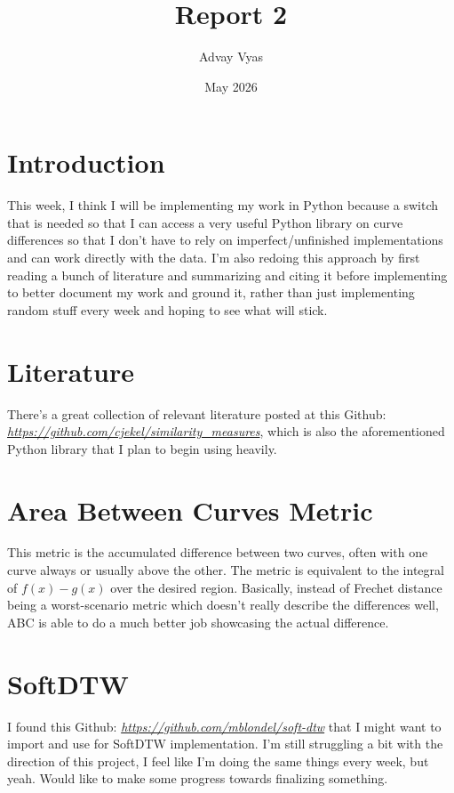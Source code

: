 \documentclass{article}
\title{Report 2}
\author{Advay Vyas}
\date{May 2026}
\begin{document}
\maketitle

\section{Introduction}
This week, I think I will be implementing my work in Python because a switch that is needed so that I can access a very useful Python library on curve differences so that I don't have to rely on imperfect/unfinished implementations and can work directly with the data. I'm also redoing this approach by first reading a bunch of literature and summarizing and citing it before implementing to better document my work and ground it, rather than just implementing random stuff every week and hoping to see what will stick. 

\section{Literature}
There's a great collection of relevant literature posted at this Github: \linebreak\textit{\href{https://github.com/cjekel/similarity_measures}{https://github.com/cjekel/similarity\_measures}}, which is also the aforementioned Python library that I plan to begin using heavily. 

\section{Area Between Curves Metric}
This metric is the accumulated difference between two curves, often with one curve always or usually above the other. The metric is equivalent to the integral of $f(x) - g(x)$ over the desired region. Basically, instead of Frechet distance being a worst-scenario metric which doesn't really describe the differences well, ABC is able to do a much better job showcasing the actual difference. 

\section{SoftDTW}
I found this Github: \textit{\href{https://github.com/mblondel/soft-dtw}{https://github.com/mblondel/soft-dtw}} that I might want to import and use for SoftDTW implementation. I'm still struggling a bit with the direction of this project, I feel like I'm doing the same things every week, but yeah. Would like to make some progress towards finalizing something.
\end{document}
